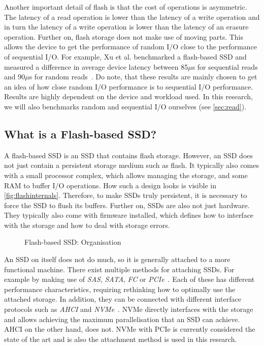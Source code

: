 Another important detail of flash is that the cost of operations is asymmetric. The latency of a read operation is lower than the latency of a write operation and in turn the latency of a write operation is lower than the latency of an erasure operation. Further on, flash storage does not make use of moving parts. This allows the device to get the performance of random I/O close to the performance of sequential I/O. For example, Xu et al. benchmarked a flash-based SSD and measured a difference in average device latency between 85$\mu$s for sequential reads and 90$\mu$s for random reads~\cite{xu2015performance}. Do note, that these results are mainly chosen to get an idea of how close random I/O performance is to sequential I/O performance. Results are highly dependent on the device and workload used. In this research, we will also benchmarks random and sequential I/O ourselves (see \autoref{sec:read}). 

\subsection{What is a Flash-based SSD?}
A flash-based SSD is an SSD that contains flash storage. However, an SSD does not just contain a persistent storage medium such as flash. It typically also comes with a small processor complex, which allows managing the storage, and some RAM to buffer I/O operations. How such a design looks is visible in \autoref{fig:flashinternals}. Therefore, to make SSDs truly persistent, it is necessary to force the SSD to flush its buffers. Further on, SSDs are also not just hardware. They typically also come with firmware installed, which defines how to interface with the storage and how to deal with storage errors.

\begin{figure}[h]
\centering
\begin{minipage}{0.75\textwidth}
  \centering
  
\end{minipage}%
\caption{ Flash-based SSD: Organisation }
\label{fig:flashinternals}
\end{figure}

An SSD on itself does not do much, so it is generally attached to a more functional machine. There exist multiple methods for attaching SSDs. For example by making use of \textit{SAS}, \textit{SATA}, \textit{FC} or \textit{PCIe}~\cite{wong2013ssd}. Each of these has different performance characteristics, requiring rethinking how to optimally use the attached storage. In addition, they can be connected with different interface protocols such as \textit{AHCI} and \textit{NVMe}~\cite{landsman2013ahci}. NVMe directly interfaces with the storage and allows achieving the maximum parallelisation that an SSD can achieve. AHCI on the other hand, does not. NVMe with PCIe is currently considered the state of the art and is also the attachment method is used in this research.

